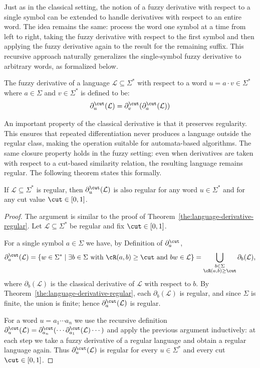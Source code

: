 \noindent
Just as in the classical setting, the notion of a fuzzy derivative with respect to a single symbol can be extended to handle derivatives with respect to an entire word. The idea remains the same: process the word one symbol at a time from left to right, taking the fuzzy derivative with respect to the first symbol and then applying the fuzzy derivative again to the result for the remaining suffix. This recursive approach naturally generalizes the single-symbol fuzzy derivative to arbitrary words, as formalized below.


\begin{definition}
    The fuzzy derivative of a language $\mathcal{L} \subseteq \Sigma^*$ with respect to a word $u=a\cdot v \in \Sigma^*$ where $a \in \Sigma$ and $v \in \Sigma^*$ is defined to be:
    $$
    \partial^\cut_u(\mathcal{L}) = \partial^\cut_v(\partial^\cut_a(\mathcal{L}))
    $$
\end{definition}


\noindent
An important property of the classical derivative is that it preserves regularity. This ensures that repeated differentiation never produces a language outside the regular class, making the operation suitable for automata-based  algorithms. The same closure property holds in the fuzzy setting: even when derivatives are taken with respect to a cut-based similarity relation, the resulting language remains regular. The following theorem states this formally.


\begin{theorem}\label{the:language-fuzzy-derivative-regular}
    If $\mathcal{L} \subseteq \Sigma^*$ is regular, then 
    $\partial^\cut_u(\mathcal{L})$ is also regular for any word 
    $u \in \Sigma^*$ and for any cut value $\cut \in [0,1]$.
\end{theorem}

\begin{proof}
The argument is similar to the proof of Theorem~\ref{the:language-derivative-regular}.
Let $\mathcal{L} \subseteq \Sigma^*$ be regular and fix $\cut \in [0,1]$.

For a single symbol $a \in \Sigma$ we have, by Definition of $\partial_a^\cut$,
\[
  \partial_a^\cut(\mathcal{L})
  = \{ w \in \Sigma^* \mid \exists b \in \Sigma \text{ with } \cR(a,b) \ge \cut
       \text{ and } bw \in \mathcal{L} \}
  = \bigcup_{\substack{b \in \Sigma \\ \cR(a,b) \ge \cut}} \partial_b(\mathcal{L}),
\]
where $\partial_b(\mathcal{L})$ is the classical derivative of $\mathcal{L}$ with
respect to $b$. By Theorem~\ref{the:language-derivative-regular}, each
$\partial_b(\mathcal{L})$ is regular, and since $\Sigma$ is finite, the union
is finite; hence $\partial_a^\cut(\mathcal{L})$ is regular.

For a word $u = a_1 \cdots a_n$ we use the recursive definition
$\partial_u^\cut(\mathcal{L}) = \partial_{a_n}^\cut(\cdots \partial_{a_1}^\cut(\mathcal{L}) \cdots)$
and apply the previous argument inductively: at each step we take a fuzzy
derivative of a regular language and obtain a regular language again. Thus
$\partial_u^\cut(\mathcal{L})$ is regular for every $u \in \Sigma^*$ and every
cut $\cut \in [0,1]$.
\end{proof}


